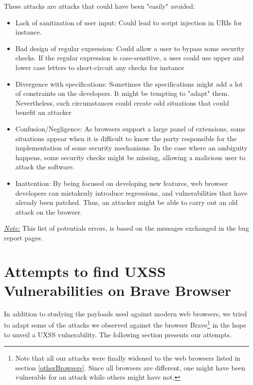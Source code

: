 \documentclass[journal]{IEEEtran}
\begin{document}
\medskip

These attacks are attacks that could have been "easily" avoided:

\begin{itemize}
\item Lack of sanitization of user input: Could lead to script injection in URIs for instance.
\item Bad design of regular expression: Could allow a user to bypass some security checks. If the regular expression is case-sensitive, a user could use upper and lower case letters to short-circuit any checks for instance \cite{CVE-2012-0455}
\item Divergence with specifications: Sometimes the specifications might add a lot of constraints on the developers. It might be tempting to "adapt" them. Nevertheless, such circumstances could create odd situations that could benefit an attacker \cite{CVE-2012-3985}
\item Confusion/Negligence: As browsers support a large panel of extensions, some situations appear when it is difficult to know the party responsible for the implementation of some security mechanisms. In the case where an ambiguity happens, some security checks might be missing, allowing a malicious user to attack the software.
\item Inattention: By being focused on developing new features, web browser developers can mistakenly introduce regressions, and vulnerabilities that have already been patched. Thus, an attacker might be able to carry out an old attack on the browser.
\end{itemize}

\medskip

\underline{\emph{Note:}} This list of potentials errors, is based on the messages exchanged in the bug report pages.

\section{Attempts to find UXSS Vulnerabilities on Brave Browser}

In addition to studying the payloads used against modern web browsers, we tried to adapt some of the attacks we observed against the browser Brave\footnote{Note that all our attacks were finally widened to the web browsers listed in section \ref{otherBrowsers}. Since all browsers are different, one might have been vulnerable for an attack while others might have not.} in the hope to unveil a UXSS vulnerability. The following section presents our attempts.
\end{document}
